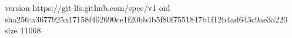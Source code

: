 version https://git-lfs.github.com/spec/v1
oid sha256:a3677925a17158f402690ce1f20bb4b5f80f7551847b1f12b4ad643c9ae3a220
size 11068
